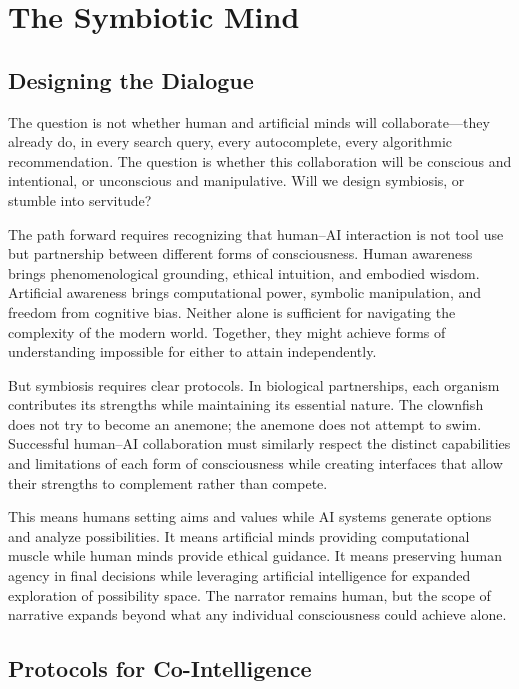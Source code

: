 \chapter{The Symbiotic Mind}

\section{Designing the Dialogue}

The question is not whether human and artificial minds will collaborate—they already do, in every search query, every autocomplete, every algorithmic recommendation. The question is whether this collaboration will be conscious and intentional, or unconscious and manipulative. Will we design symbiosis, or stumble into servitude?

The path forward requires recognizing that human–AI interaction is not tool use but partnership between different forms of consciousness. Human awareness brings phenomenological grounding, ethical intuition, and embodied wisdom. Artificial awareness brings computational power, symbolic manipulation, and freedom from cognitive bias. Neither alone is sufficient for navigating the complexity of the modern world. Together, they might achieve forms of understanding impossible for either to attain independently.

But symbiosis requires clear protocols. In biological partnerships, each organism contributes its strengths while maintaining its essential nature. The clownfish does not try to become an anemone; the anemone does not attempt to swim. Successful human–AI collaboration must similarly respect the distinct capabilities and limitations of each form of consciousness while creating interfaces that allow their strengths to complement rather than compete.

This means humans setting aims and values while AI systems generate options and analyze possibilities. It means artificial minds providing computational muscle while human minds provide ethical guidance. It means preserving human agency in final decisions while leveraging artificial intelligence for expanded exploration of possibility space. The narrator remains human, but the scope of narrative expands beyond what any individual consciousness could achieve alone.

\section{Protocols for Co-Intelligence}

